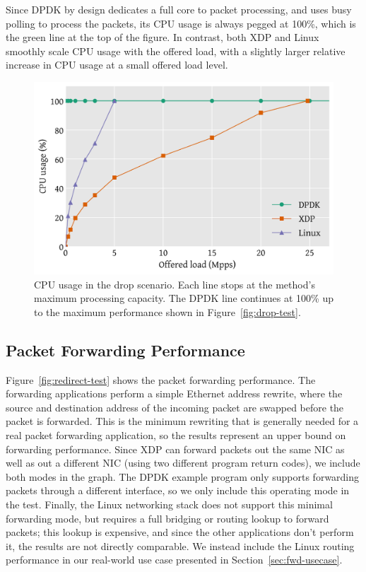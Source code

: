 \documentclass[10pt,sigconf,anonymous]{acmart}
\begin{document}
Since DPDK by design dedicates a full core to packet processing, and uses busy
polling to process the packets, its CPU usage is always pegged at 100\%, which
is the green line at the top of the figure. In contrast, both XDP and Linux
smoothly scale CPU usage with the offered load, with a slightly larger relative
increase in CPU usage at a small offered load level.

\begin{figure}[t]
\centering
\includegraphics[width=\linewidth]{figures/drop-cpu.pdf}
\caption{\label{fig:drop-cpu} CPU usage in the drop scenario. Each line stops at
  the method's maximum processing capacity. The DPDK line continues at 100\% up
  to the maximum performance shown in Figure~\ref{fig:drop-test}.}
\end{figure}


\subsection{Packet Forwarding Performance}
\label{sec:pack-forw-perf}
Figure~\ref{fig:redirect-test} shows the packet forwarding performance. The
forwarding applications perform a simple Ethernet address rewrite, where the
source and destination address of the incoming packet are swapped before the
packet is forwarded. This is the minimum rewriting that is generally needed for
a real packet forwarding application, so the results represent an upper bound on
forwarding performance. Since XDP can forward packets out the same NIC as well
as out a different NIC (using two different program return codes), we include
both modes in the graph. The DPDK example program only supports forwarding
packets through a different interface, so we only include this operating mode in
the test. Finally, the Linux networking stack does not support this minimal
forwarding mode, but requires a full bridging or routing lookup to forward
packets; this lookup is expensive, and since the other applications don't
perform it, the results are not directly comparable. We instead include the
Linux routing performance in our real-world use case presented in
Section~\ref{sec:fwd-usecase}.
\end{document}
